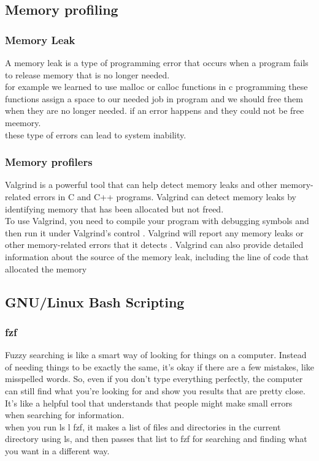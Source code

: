 \documentclass{article}
\begin{document}
\subsection{Memory profiling}
\subsubsection{Memory Leak}
A memory leak is a type of programming error that occurs when a program fails to release memory that is no longer needed.\\for example we learned to use malloc or calloc functions in c programming these functions assign a space to our needed job in program and we should free them when they are no longer needed. if an error happens and they could not be free meemory.\\
these type of errors can lead to system inability.
\subsubsection{Memory profilers}
Valgrind is a powerful tool that can help detect memory leaks and other memory-related errors in C and C++ programs. Valgrind can detect memory leaks by identifying memory that has been allocated but not freed.\\To use Valgrind, you need to compile your program with debugging symbols and then run it under Valgrind’s control . Valgrind will report any memory leaks or other memory-related errors that it detects . Valgrind can also provide detailed information about the source of the memory leak, including the line of code that allocated the memory 
\subsection{GNU/Linux Bash Scripting}
\subsubsection{fzf}
Fuzzy searching is like a smart way of looking for things on a computer. Instead of needing things to be exactly the same, it's okay if there are a few mistakes, like misspelled words. So, even if you don't type everything perfectly, the computer can still find what you're looking for and show you results that are pretty close. It's like a helpful tool that understands that people might make small errors when searching for information.\\
when you run ls l fzf, it makes a list of files and directories in the current directory using ls, and then passes that list to fzf for searching and finding what you want in a different way.
\end{document}
